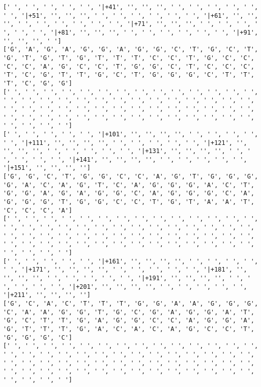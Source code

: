 \documentclass{article}
\begin{document}
\begin{Verbatim}
[' ', ' ', ' ', ' ', ' ', '|+41', '', '', '', ' ', ' ', ' ', ' ', ' ', ' ', '|+51', '', '', '', ' ', ' ', ' ', ' ', ' ', ' ', '|+61', '', '', '', ' ', ' ', ' ', ' ', ' ', ' ', '|+71', '', '', '', ' ', ' ', ' ', ' ', ' ', ' ', '|+81', '', '', '', ' ', ' ', ' ', ' ', ' ', ' ', '|+91', '', '', '', ' ']
['G', 'A', 'G', 'A', 'G', 'G', 'A', 'G', 'G', 'C', 'T', 'G', 'C', 'T', 'G', 'T', 'G', 'T', 'G', 'T', 'T', 'T', 'C', 'C', 'T', 'G', 'C', 'C', 'C', 'C', 'A', 'G', 'C', 'C', 'T', 'G', 'G', 'C', 'T', 'C', 'C', 'C', 'T', 'C', 'G', 'T', 'T', 'G', 'C', 'T', 'G', 'G', 'G', 'C', 'T', 'T', 'T', 'C', 'G', 'G']
[' ', ' ', ' ', ' ', ' ', ' ', ' ', ' ', ' ', ' ', ' ', ' ', ' ', ' ', ' ', ' ', ' ', ' ', ' ', ' ', ' ', ' ', ' ', ' ', ' ', ' ', ' ', ' ', ' ', ' ', ' ', ' ', ' ', ' ', ' ', ' ', ' ', ' ', ' ', ' ', ' ', ' ', ' ', ' ', ' ', ' ', ' ', ' ', ' ', ' ', ' ', ' ', ' ', ' ', ' ', ' ', ' ', ' ', ' ', ' ']
[' ', ' ', ' ', ' ', ' ', '|+101', '', '', '', '', ' ', ' ', ' ', ' ', ' ', '|+111', '', '', '', '', ' ', ' ', ' ', ' ', ' ', '|+121', '', '', '', '', ' ', ' ', ' ', ' ', ' ', '|+131', '', '', '', '', ' ', ' ', ' ', ' ', ' ', '|+141', '', '', '', '', ' ', ' ', ' ', ' ', ' ', '|+151', '', '', '', '']
['G', 'G', 'C', 'T', 'G', 'G', 'C', 'C', 'A', 'G', 'T', 'G', 'G', 'G', 'G', 'A', 'C', 'A', 'G', 'T', 'C', 'A', 'G', 'G', 'G', 'A', 'C', 'T', 'G', 'G', 'A', 'G', 'A', 'G', 'G', 'C', 'A', 'G', 'G', 'G', 'C', 'A', 'G', 'G', 'G', 'T', 'G', 'G', 'C', 'C', 'T', 'G', 'T', 'A', 'A', 'T', 'C', 'C', 'C', 'A']
[' ', ' ', ' ', ' ', ' ', ' ', ' ', ' ', ' ', ' ', ' ', ' ', ' ', ' ', ' ', ' ', ' ', ' ', ' ', ' ', ' ', ' ', ' ', ' ', ' ', ' ', ' ', ' ', ' ', ' ', ' ', ' ', ' ', ' ', ' ', ' ', ' ', ' ', ' ', ' ', ' ', ' ', ' ', ' ', ' ', ' ', ' ', ' ', ' ', ' ', ' ', ' ', ' ', ' ', ' ', ' ', ' ', ' ', ' ', ' ']
[' ', ' ', ' ', ' ', ' ', '|+161', '', '', '', '', ' ', ' ', ' ', ' ', ' ', '|+171', '', '', '', '', ' ', ' ', ' ', ' ', ' ', '|+181', '', '', '', '', ' ', ' ', ' ', ' ', ' ', '|+191', '', '', '', '', ' ', ' ', ' ', ' ', ' ', '|+201', '', '', '', '', ' ', ' ', ' ', ' ', ' ', '|+211', '', '', '', '']
['G', 'C', 'A', 'C', 'T', 'T', 'T', 'G', 'G', 'A', 'A', 'G', 'G', 'G', 'C', 'A', 'A', 'G', 'G', 'T', 'G', 'C', 'G', 'A', 'G', 'G', 'A', 'T', 'G', 'C', 'T', 'T', 'G', 'A', 'G', 'G', 'C', 'C', 'A', 'G', 'G', 'A', 'G', 'T', 'T', 'T', 'G', 'A', 'C', 'A', 'C', 'A', 'G', 'C', 'C', 'T', 'G', 'G', 'G', 'C']
[' ', ' ', ' ', ' ', ' ', ' ', ' ', ' ', ' ', ' ', ' ', ' ', ' ', ' ', ' ', ' ', ' ', ' ', ' ', ' ', ' ', ' ', ' ', ' ', ' ', ' ', ' ', ' ', ' ', ' ', ' ', ' ', ' ', ' ', ' ', ' ', ' ', ' ', ' ', ' ', ' ', ' ', ' ', ' ', ' ', ' ', ' ', ' ', ' ', ' ', ' ', ' ', ' ', ' ', ' ', ' ', ' ', ' ', ' ', ' ']

\end{Verbatim}
\end{document}
